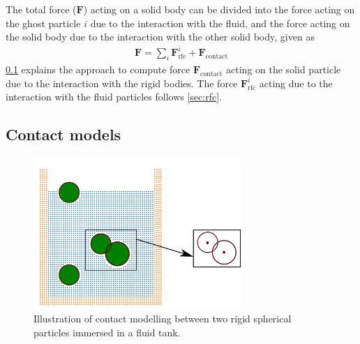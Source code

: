 \documentclass[preprint,12pt]{elsarticle}
\newcommand{\ten}[1]{\ensuremath{\mathbf{#1}}}
\begin{document}
The total force ($\ten{F}$) acting on a solid body can be divided into the
force acting on the ghost particle $i$ due to the interaction with the fluid,
and the force acting on the solid body due to the interaction with the other
solid body, given as
\begin{eqnarray}
  \label{eq:rfc:rb_particle_pos_update}
  \ten{F} = \sum_i \ten{F}_{\text{rfc}}^i + \ten{F}_{\text{contact}}
\end{eqnarray}
\cref{sec:dem} explains the approach to compute force
$\ten{F}_{\text{contact}}$ acting on the solid particle due to the interaction
with the rigid bodies. The force $\ten{F}_{\text{rfc}}^i$ acting due to the
interaction with the fluid particles follows \cref{sec:rfc}.


\FloatBarrier%
\subsection{Contact models}
\label{sec:dem}

\begin{figure}[!htpb]
  \centering
  \includegraphics[width=0.7\textwidth]{images/spherical_particles_dem_representation}
  \caption{Illustration of contact modelling between two rigid spherical
    particles immersed in a fluid tank.}
  \label{fig:spherical-particles-in-tank-dem}
\end{figure}
\end{document}
